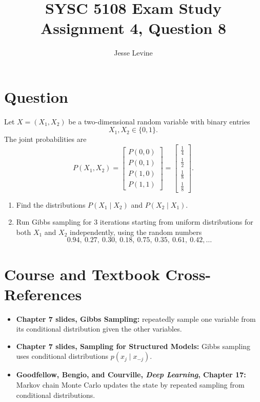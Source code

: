 \documentclass[11pt]{article}
\title{SYSC 5108 Exam Study\\Assignment 4, Question 8}
\author{Jesse Levine}
\date{}
\begin{document}
\maketitle

\section*{Question}

Let \(X=(X_1,X_2)\) be a two-dimensional random variable with binary entries
\[
    X_1,X_2 \in \{0,1\}.
\]
The joint probabilities are
\[
    P(X_1,X_2)
    =
    \begin{bmatrix}
        P(0,0)\\
        P(0,1)\\
        P(1,0)\\
        P(1,1)
    \end{bmatrix}
    =
    \begin{bmatrix}
        \frac14\\[4pt]
        \frac12\\[4pt]
        \frac18\\[4pt]
        \frac18
    \end{bmatrix}.
\]

\begin{enumerate}[label=(\alph*)]
    \item Find the distributions \(P(X_1\mid X_2)\) and \(P(X_2\mid X_1)\).
    \item Run Gibbs sampling for \(3\) iterations starting from uniform
    distributions for both \(X_1\) and \(X_2\) independently, using the random
    numbers
    \[
        0.94,\ 0.27,\ 0.30,\ 0.18,\ 0.75,\ 0.35,\ 0.61,\ 0.42,\ldots
    \]
\end{enumerate}

\section*{Course and Textbook Cross-References}

\begin{itemize}
    \item \textbf{Chapter 7 slides, Gibbs Sampling:} repeatedly sample one
    variable from its conditional distribution given the other variables.
    \item \textbf{Chapter 7 slides, Sampling for Structured Models:} Gibbs
    sampling uses conditional distributions \(p(x_j\mid x_{-j})\).
    \item \textbf{Goodfellow, Bengio, and Courville, \emph{Deep Learning},
    Chapter 17:} Markov chain Monte Carlo updates the state by repeated sampling
    from conditional distributions.
\end{itemize}
\end{document}
